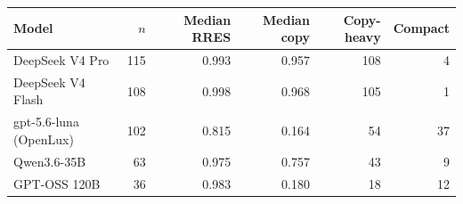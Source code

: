 \begin{tabular}{lrrrrr}
\toprule
\textbf{Model} & \textbf{$n$} & \textbf{Median RRES}
  & \textbf{Median copy} & \textbf{Copy-heavy} & \textbf{Compact} \\
\midrule
DeepSeek V4 Pro & 115 & 0.993 & 0.957 & 108 & 4 \\
DeepSeek V4 Flash & 108 & 0.998 & 0.968 & 105 & 1 \\
gpt-5.6-luna (OpenLux) & 102 & 0.815 & 0.164 & 54 & 37 \\
Qwen3.6-35B & 63 & 0.975 & 0.757 & 43 & 9 \\
GPT-OSS 120B & 36 & 0.983 & 0.180 & 18 & 12 \\
\bottomrule
\end{tabular}
